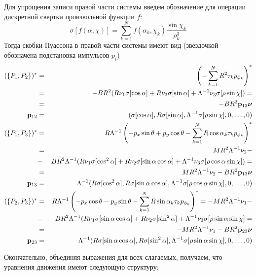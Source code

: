 Для упрощения записи правой части системы введем обозначение для операции дискретной свертки произвольной функции $f$:
$$
\sigma[f(\alpha,\chi)] = \sum\limits_{k=1}^{N} f(\alpha_k,\chi_k) \frac{\sin\chi_k}{\rho_k^3}
$$
Тогда скобки Пуассона в правой части системы имеют вид (звездочкой обозначена подстановка импульсов $p_i$)
\begin{eqnarray*}
    (\{P_1,P_2\})^* &=& \left(-\sum\limits_{k=1}^{N} R^2\tau_kp_{\phi_k}\right)^* \\
                    &=& -BR^2(R\nu_1 \sigma[\cos\alpha] + R\nu_2 \sigma[\sin\alpha] + \Lambda^{-1}\nu_3\sigma[\rho\sin\chi]) = \\
                    &=& -BR^2\mathbf{p}_{12}\boldsymbol{\mathbf{\nu}}\\
    \mathbf{p}_{12}      &=& (\sigma[\cos\alpha], R\sigma[\sin\alpha], \Lambda^{-1}\sigma[\rho\sin\chi], 0,\dots,0) \\
    (\{P_1,P_3\})^* &=& {R}{\Lambda}^{-1}\left(-p_x\sin\theta + p_y\cos\theta - \sum\limits_{k=1}^{N} R\cos\alpha_k\tau_kp_{\phi_k}\right)^* \\
                    &=& {MR^2}{\Lambda}^{-1}\nu_2 - \\
                    &-& {BR^2}{\Lambda}^{-1}(R\nu_1 \sigma[\cos^2\alpha] + R\nu_2 \sigma[\sin\alpha\cos\alpha] + 
                        \Lambda^{-1}\nu_3\sigma[\rho\cos\alpha\sin\chi]) = \\
                    &=& {MR^2}{\Lambda}^{-1}\nu_2-{BR^2} \mathbf{p}_{13}\boldsymbol{\mathbf{\nu}} \\
    \mathbf{p}_{13}      &=& \Lambda^{-1} (R\sigma[\cos^2\alpha], R\sigma[\sin\alpha\cos\alpha], \Lambda^{-1}\sigma[\rho\cos\alpha\sin\chi], 0,\dots,0) \\
    (\{P_2,P_3\})^* &=& {R}{\Lambda}^{-1}\left(-p_x\cos\theta - p_y\sin\theta - \sum\limits_{k=1}^{N} R\sin\alpha_k\tau_kp_{\phi_k}\right)^* =    
                        -{MR^2}{\Lambda}^{-1}\nu_1 - \\
                    &-& {BR^2}{\Lambda}^{-1}(R\nu_1\sigma[\sin\alpha\cos\alpha] + R\nu_2\sigma[\sin^2\alpha]
                        + \Lambda^{-1}\nu_3\sigma[\rho\sin\alpha\sin\chi] = \\
                    &=& -{MR^2}{\Lambda}^{-1}\nu_1 -{BR^2}\mathbf{p}_{23}\boldsymbol{\mathbf{\nu}}\\
    \mathbf{p}_{23}      &=& \Lambda^{-1}(R\sigma[\sin\alpha\cos\alpha], R\sigma[\sin^2\alpha], \Lambda^{-1}\sigma[\rho\sin\alpha\sin\chi], 0,\dots,0)
\end{eqnarray*}

Окончательно, объединяя выражения для всех слагаемых, получаем, что уравнения движения имеют следующую структуру:

